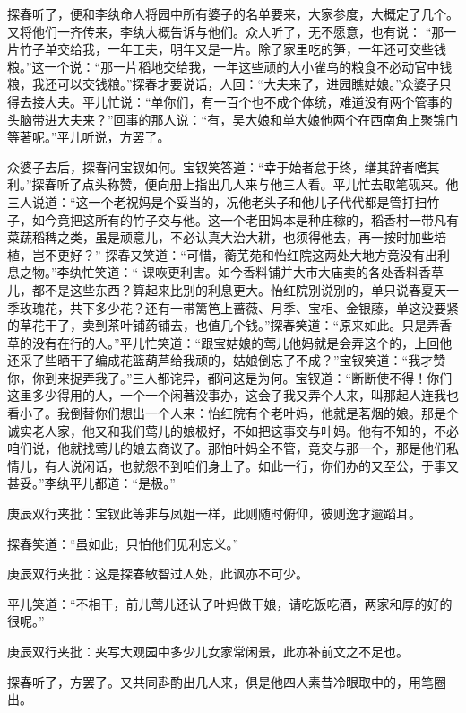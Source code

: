 \begin{parag}


    探春听了，便和李纨命人将园中所有婆子的名单要来，大家参度，大概定了几个。又将他们一齐传来，李纨大概告诉与他们。众人听了，无不愿意，也有说： “那一片竹子单交给我，一年工夫，明年又是一片。除了家里吃的笋，一年还可交些钱粮。”这一个说：“那一片稻地交给我，一年这些顽的大小雀鸟的粮食不必动官中钱粮，我还可以交钱粮。”探春才要说话，人回：“大夫来了，进园瞧姑娘。”众婆子只得去接大夫。平儿忙说：“单你们，有一百个也不成个体统，难道没有两个管事的头脑带进大夫来？”回事的那人说：“有，吴大娘和单大娘他两个在西南角上聚锦门等著呢。”平儿听说，方罢了。
\end{parag}


\begin{parag}


    众婆子去后，探春问宝钗如何。宝钗笑答道：“幸于始者怠于终，缮其辞者嗜其利。”探春听了点头称赞，便向册上指出几人来与他三人看。平儿忙去取笔砚来。他三人说道：“这一个老祝妈是个妥当的，况他老头子和他儿子代代都是管打扫竹子，如今竟把这所有的竹子交与他。这一个老田妈本是种庄稼的，稻香村一带凡有菜蔬稻稗之类，虽是顽意儿，不必认真大治大耕，也须得他去，再一按时加些培植，岂不更好？” 探春又笑道：“可惜，蘅芜苑和怡红院这两处大地方竟没有出利息之物。”李纨忙笑道：“ 课咴更利害。如今香料铺并大市大庙卖的各处香料香草儿，都不是这些东西？算起来比别的利息更大。怡红院别说别的，单只说春夏天一季玫瑰花，共下多少花？还有一带篱笆上蔷薇、月季、宝相、金银藤，单这没要紧的草花干了，卖到茶叶铺药铺去，也值几个钱。”探春笑道：“原来如此。只是弄香草的没有在行的人。”平儿忙笑道：“跟宝姑娘的莺儿他妈就是会弄这个的，上回他还采了些晒干了编成花篮葫芦给我顽的，姑娘倒忘了不成？”宝钗笑道：“我才赞你，你到来捉弄我了。”三人都诧异，都问这是为何。宝钗道：“断断使不得！你们这里多少得用的人，一个一个闲著没事办，这会子我又弄个人来，叫那起人连我也看小了。我倒替你们想出一个人来：怡红院有个老叶妈，他就是茗烟的娘。那是个诚实老人家，他又和我们莺儿的娘极好，不如把这事交与叶妈。他有不知的，不必咱们说，他就找莺儿的娘去商议了。那怕叶妈全不管，竟交与那一个，那是他们私情儿，有人说闲话，也就怨不到咱们身上了。如此一行，你们办的又至公，于事又甚妥。”李纨平儿都道：“是极。”\begin{note}庚辰双行夹批：宝钗此等非与凤姐一样，此则随时俯仰，彼则逸才逾蹈耳。\end{note}探春笑道：“虽如此，只怕他们见利忘义。”\begin{note}庚辰双行夹批：这是探春敏智过人处，此讽亦不可少。\end{note}平儿笑道：“不相干，前儿莺儿还认了叶妈做干娘，请吃饭吃酒，两家和厚的好的很呢。”\begin{note}庚辰双行夹批：夹写大观园中多少儿女家常闲景，此亦补前文之不足也。\end{note}探春听了，方罢了。又共同斟酌出几人来，俱是他四人素昔冷眼取中的，用笔圈出。
\end{parag}


